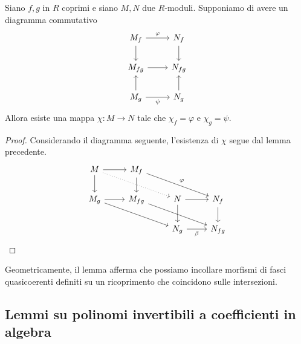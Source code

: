 \begin{lemma}\label{LmMorfismiDiFasciQuasicoerentiSiIncollanoSuRicoprimento}
Siano $f,g$ in $R$ coprimi e siano $M,N$ due $R$-moduli. Supponiamo di avere un diagramma commutativo 
\[\begin{tikzcd}
	{M_f} & {N_f} \\
	{M_{fg}} & {N_{fg}} \\
	{M_g} & {N_g}
	\arrow["\varphi", from=1-1, to=1-2]
	\arrow[from=1-1, to=2-1]
	\arrow[from=1-2, to=2-2]
	\arrow[from=2-1, to=2-2]
	\arrow[from=3-1, to=2-1]
	\arrow["\psi"', from=3-1, to=3-2]
	\arrow[from=3-2, to=2-2]
\end{tikzcd}\]
Allora esiste una mappa $\chi\colon M\to N$ tale che $\chi_f=\varphi$ e $\chi_g=\psi$.
\end{lemma}
\begin{proof}
Considerando il diagramma seguente, l'esistenza di $\chi$ segue dal lemma precedente. 
\[\begin{tikzcd}
	M & {M_f} \\
	{M_g} & {M_{fg}} & N & {N_f} \\
	&& {N_g} & {N_{fg}}
	\arrow[from=1-1, to=1-2]
	\arrow[from=1-1, to=2-1]
	\arrow[dotted, from=1-1, to=2-3]
	\arrow[from=1-2, to=2-2]
	\arrow["\varphi", from=1-2, to=2-4]
	\arrow[from=2-1, to=2-2]
	\arrow[from=2-1, to=3-3]
	\arrow[from=2-2, to=3-4]
	\arrow[from=2-3, to=2-4]
	\arrow[from=2-3, to=3-3]
	\arrow[from=2-4, to=3-4]
	\arrow["\beta"', from=3-3, to=3-4]
\end{tikzcd}\]
\end{proof}
\begin{remark}
Geometricamente, il lemma afferma che possiamo incollare morfismi di fasci quasicoerenti definiti su un ricoprimento che coincidono sulle intersezioni.
\end{remark}

\subsection{Lemmi su polinomi invertibili a coefficienti in algebra}


